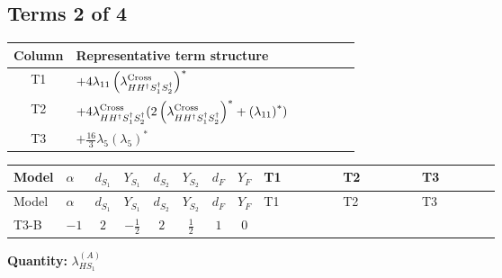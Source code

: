 \documentclass[8pt]{article}
\begin{document}
\begin{landscape}
\subsection*{Terms 2 of 4}
\begin{center}
\begin{tabular}{@{}c >{\raggedright\arraybackslash}p{0.82\linewidth}@{}}
\toprule
Column & Representative term structure \\
\midrule
T1 & \(\displaystyle +4 {\lambda_{11}} \left({\lambda_{H H^\dagger S_1^\dagger S_2^\dagger}^{\rm Cross}}\right)^{*}\) \\
\midrule
T2 & \(\displaystyle +4 {\lambda_{H H^\dagger S_1^\dagger S_2^\dagger}^{\rm Cross}} (2 \left({\lambda_{H H^\dagger S_1^\dagger S_2^\dagger}^{\rm Cross}}\right)^{*}+\left({\lambda_{11}}\right)^{*})\) \\
\midrule
T3 & \(\displaystyle +\frac{16}{3} {\lambda_5} \left({\lambda_5}\right)^{*}\) \\
\midrule
\bottomrule
\end{tabular}
\end{center}
\smallskip
\tiny
\begin{longtable}{@{}llcccccc >{\raggedright\arraybackslash}p{0.21\linewidth} >{\raggedright\arraybackslash}p{0.21\linewidth} >{\raggedright\arraybackslash}p{0.21\linewidth}@{}}
\toprule
Model & $\alpha$ & $d_{S_1}$ & $Y_{S_1}$ & $d_{S_2}$ & $Y_{S_2}$ & $d_F$ & $Y_F$ & T1 & T2 & T3 \\
\midrule
\endfirsthead
\toprule
Model & $\alpha$ & $d_{S_1}$ & $Y_{S_1}$ & $d_{S_2}$ & $Y_{S_2}$ & $d_F$ & $Y_F$ & T1 & T2 & T3 \\
\midrule
\endhead
T3-B & $-1$ & $2$ & $-\frac{1}{2}$ & $2$ & $\frac{1}{2}$ & $1$ & $0$ & \scriptsize\adjustbox{max width=\linewidth}{$\begin{gathered} +4 {\lambda_{11}} \left({\lambda_{H H^\dagger S_1^\dagger S_2^\dagger}^{\rm Cross}}\right)^{*}\end{gathered}$} & \scriptsize\adjustbox{max width=\linewidth}{$\begin{gathered} +4 {\lambda_{H H^\dagger S_1^\dagger S_2^\dagger}^{\rm Cross}} (2 \left({\lambda_{H H^\dagger S_1^\dagger S_2^\dagger}^{\rm Cross}}\right)^{*}+\left({\lambda_{11}}\right)^{*})\end{gathered}$} & \scriptsize\adjustbox{max width=\linewidth}{$\begin{gathered} +\frac{16}{3} {\lambda_5} \left({\lambda_5}\right)^{*}\end{gathered}$} \\
\midrule
\bottomrule
\end{longtable}
\clearpage
\noindent\textbf{Quantity: }$\lambda_{HS_1}^{(A)}$\par\smallskip

\end{landscape}
\end{document}
